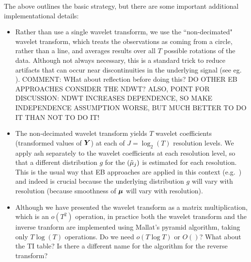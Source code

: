 \documentclass[12pt]{article}
\begin{document}
The above outlines the basic strategy, but there are some important
 additional implementational details:
\begin{itemize}
\item Rather than use a single wavelet transforrm, we use the ``non-decimated" wavelet transform, which treats the observations as coming
from a circle, rather than a line, and averages results over all $T$ possible rotations of the data. Although not always necessary, this is a standard trick to reduce artifacts that can occur near discontinuities in the underlying signal (see eg. \cite{Coifman1995Translationinvariant}). COMMENT: WHat about reflection before doing this?
DO OTHER EB APPROACHES CONSIDER THE NDWT? ALSO, POINT FOR DISCUSSION: NDWT INCREASES DEPENDENCE, SO MAKE INDEPENDENCE ASSUMPTION WORSE, BUT MUCH BETTER TO DO IT THAN NOT TO DO IT!
\item The non-decimated wavelet transform yields $T$ wavelet coefficients (transformed values of $\bm{Y}$) 
at each of $J=\log_2(T)$ resolution levels.
We apply ash separately to the wavelet coefficients at each resolution level, so that
a different distribution $g$ for the $(\tilde\mu_j)$ is estimated for each resolution. This is the usual way that
EB approaches are applied in this context (e.g.~\cite{checkcgandjs}) and indeed is crucial because
the underlying distribution $g$  will vary with resolution (because smoothness of $\bm{\mu}$ will vary with resolution).  
\item Although we have presented the wavelet transform as a matrix multiplication, which is an $o(T^2)$ operation, in practice both the wavelet transform and the inverse tranform are implemented using
Mallat's pyramid algorithm, taking only $T\log(T)$ operations. Do we need $o(T \log T)$ or $O()$? What about the TI table? Is there a different name for the algorithm for the reverse transform?
\end{itemize}
\end{document}
